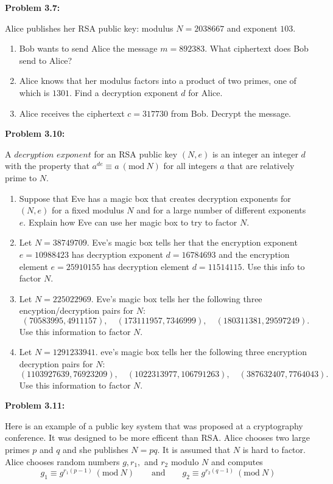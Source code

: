 \documentclass[a4paper, 11pt]{article}
\newcommand{\Mod}[1]{\ (\mathrm{mod}\ #1)}
\begin{document}
    
    
\noindent\textbf{Problem 3.7:}
    
    Alice publishes her RSA public key: modulus $N=2038667$ and exponent $103$.
    \begin{enumerate}[label=(\alph*)]
        \item Bob wants to send Alice the message $m=892383.$ What ciphertext does Bob send to Alice?
        \item Alice knows that her modulus factors into a product of two primes, one of which is $1301$. Find a decryption exponent $d$ for Alice.
        \item Alice receives the ciphertext $c=317730$ from Bob. Decrypt the message.
    \end{enumerate}
    
    
    
\noindent\textbf{Problem 3.10:}
    
    A $\textit{decryption exponent}$ for an RSA public key $(N,e)$ is an integer an integer $d$ with the property that $a^{de} \equiv a \Mod{N}$ for all integers $a$ that are relatively prime to $N$.
    \begin{enumerate}[label=(\alph*)]
        \item Suppose that Eve has a magic box that creates decryption exponents for $(N,e)$ for a fixed modulus $N$ and for a large number of different exponents $e$. Explain how Eve can use her magic box to try to factor $N$.
        \item Let $N=38749709$. Eve's magic box tells her that the encryption exponent $e=10988423$ has decryption exponent $d=16784693$ and the encryption element $e=25910155$ has decryption element $d=11514115$. Use this info to factor $N$.
        \item Let $N=225022969$. Eve's magic box tells her the following three encyption/decryption pairs for $N$: $$(70583995, 4911157), \quad (173111957, 7346999), \quad (180311381, 29597249).$$ Use this information to factor $N$.
        \item Let $N = 1291233941$. eve's magic box tells her the following three encryption decryption pairs for $N$: $$(1103927639, 76923209),\quad (1022313977, 106791263),\quad (387632407, 7764043).$$ Use this information to factor $N$.
    \end{enumerate}

\noindent\textbf{Problem 3.11:}
    
    Here is an example of a public key system that was proposed at a cryptography conference. It was designed to be more efficent than RSA.
    Alice chooses two large primes $p$ and $q$ and she publishes $N=pq$. It is assumed that $N$ is hard to factor. Alice chooses random numbers $g, r_1,$ and $r_2$ modulo $N$ and computes $$g_1 \equiv g^{r_1(p-1)}\Mod{N} \qquad \text{and} \qquad g_2\equiv g^{r_2(q-1)}\Mod{N}$$
    
\end{document}
